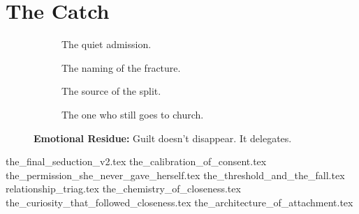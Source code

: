 
\section{The Catch}

\vfill

\begin{figure}[H]
    \centering

    \begin{subfigure}[t]{0.45\textwidth}
    \centering
    \caption*{The quiet admission.}
    \end{subfigure}
    \hfill
    \begin{subfigure}[t]{0.45\textwidth}
    \centering
    \caption*{The naming of the fracture.}
    \end{subfigure}

    \vspace{1em}

    \begin{subfigure}[t]{0.45\textwidth}
    \centering
    \caption*{The source of the split.}
    \end{subfigure}
    \hfill
    \begin{subfigure}[t]{0.45\textwidth}
    \centering
    \caption*{The one who still goes to church.}
    \end{subfigure}

    \caption*{\textbf{Emotional Residue:} Guilt doesn't disappear. It delegates.}
\end{figure}


{the_final_seduction_v2.tex}
{the_calibration_of_consent.tex}
{the_permission_she_never_gave_herself.tex}
{the_threshold_and_the_fall.tex}
{relationship_triag.tex}
{the_chemistry_of_closeness.tex}
{the_curiosity_that_followed_closeness.tex}
{the_architecture_of_attachment.tex}